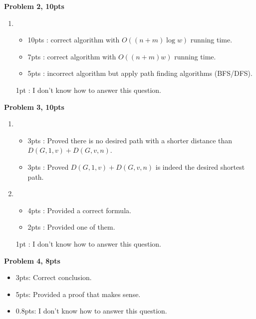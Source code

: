 \documentclass[11pt]{article}
\begin{document}
\begin{qunlist}
{\bf Problem 2, 10pts}
\begin{enumerate}
    \item 
    \begin{itemize}
        \item 10pts : correct algorithm with $O((n + m) \log w)$ running time.
        \item 7pts : correct algorithm with $O((n + m) w)$ running time.
        \item 5pts : incorrect algorithm but apply path finding algorithms (BFS/DFS).
    \end{itemize}
    1pt : I don't know how to answer this question.
\end{enumerate}

{\bf Problem 3, 10pts}
\begin{enumerate}
    \item 
    \begin{itemize}
        \item 3pts : Proved there is no desired path with a shorter distance than $D(G, 1, v) + D(G, v, n)$.
        \item 3pts : Proved $D(G, 1, v) + D(G, v, n)$ is indeed the desired shortest path.
    \end{itemize}
    \item
    \begin{itemize}
        \item 4pts : Provided a correct formula.
        \item 2pts : Provided one of them.
    \end{itemize}
    
    1pt : I don't know how to answer this question.
\end{enumerate}

{\bf Problem 4, 8pts}
\begin{itemize}
    \item 3pts: Correct conclusion.
    \item 5pts: Provided a proof that makes sense.
    \item 0.8pts: I don't know how to answer this question.
\end{itemize}

\end{qunlist}
\end{document}
